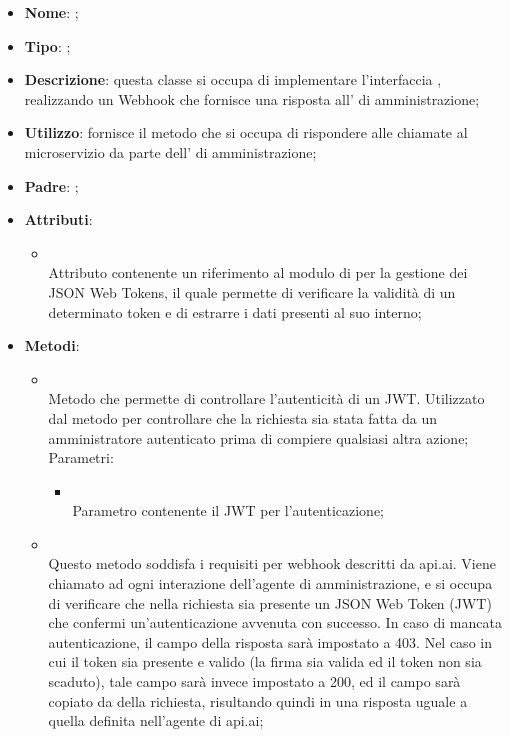 \begin{itemize}
	\item \textbf{Nome}: ;
	\item \textbf{Tipo}: ;
	\item \textbf{Descrizione}: questa classe si occupa di implementare l'interfaccia , realizzando un Webhook che fornisce una risposta all' di amministrazione;
	\item \textbf{Utilizzo}: fornisce il metodo che si occupa di rispondere alle chiamate al microservizio da parte dell' di amministrazione;
	\item \textbf{Padre}: ;
	\item \textbf{Attributi}:
	\begin{itemize}
		\item[]  \\
		Attributo contenente un riferimento al modulo di  per la gestione dei JSON Web Tokens, il quale permette di verificare la validità di un determinato token e di estrarre i dati presenti al suo interno;
	\end{itemize}
	\item \textbf{Metodi}:
	\begin{itemize}
		\item[]  \\		Metodo che permette di controllare l'autenticità di un JWT. Utilizzato dal metodo  per controllare che la richiesta sia stata fatta da un amministratore autenticato prima di compiere qualsiasi altra azione;\\
		Parametri:
		\begin{itemize}
			\item {} \\
			Parametro contenente il JWT per l'autenticazione;
		\end{itemize}
		\item[]  \\		Questo metodo soddisfa i requisiti per webhook descritti da api.ai. Viene chiamato ad ogni interazione dell'agente di amministrazione, e si occupa di verificare che nella richiesta sia presente un JSON Web Token (JWT) che confermi un'autenticazione avvenuta con successo. In caso di mancata autenticazione, il campo  della risposta sarà impostato a 403.  Nel caso in cui il token sia presente e valido (la firma sia valida ed il token non sia scaduto), tale campo sarà invece impostato a 200, ed il campo  sarà copiato da  della richiesta, risultando quindi in una risposta uguale a quella definita nell'agente di api.ai;\\

\end{itemize}
\end{itemize}
